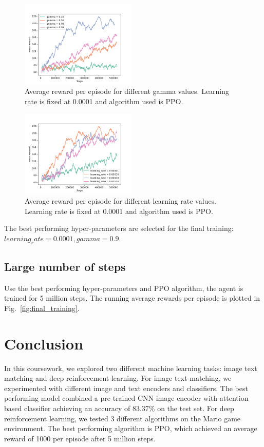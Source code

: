 \documentclass[conference]{IEEEtran}
\begin{document}
\begin{figure}
    \centering
    \includegraphics[width=0.49\textwidth]{compare_gamma.png}
    \caption{Average reward per episode for different gamma values. Learning rate is fixed at 0.0001 and algorithm used is PPO.}
    \label{fig:compare_gamma}
\end{figure}

\begin{figure}
    \centering
    \includegraphics[width=0.49\textwidth]{compare_learning_rate.png}
    \caption{Average reward per episode for different learning rate values. Learning rate is fixed at 0.0001 and algorithm used is PPO.}
    \label{fig:compare_learning_rate}
\end{figure}

The best performing hyper-parameters are selected for the final training:
\(learning_rate = 0.0001, gamma=0.9\).

\subsection{Large number of steps}

Use the best performing hyper-parameters and PPO algorithm, the agent is trained for 5 million steps. The running average rewards per episode is plotted in Fig.~\ref{fig:final_training}.

\section{Conclusion}

In this coursework, we explored two different machine learning tasks: image text matching and deep reinforcement learning. For image text matching, we experimented with different image and text encoders and classifiers. The best performing model combined a pre-trained CNN image encoder with attention based classifier achieving an accuracy of 83.37\% on the test set. For deep reinforcement learning, we tested 3 different algorithms on the Mario game environment. The best performing algorithm is PPO, which achieved an average reward of 1000 per episode after 5 million steps.



\end{document}

